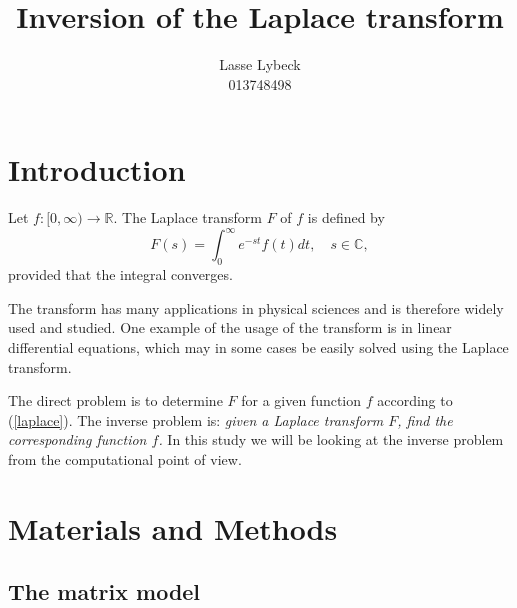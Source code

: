\documentclass[12pt,a4]{article}
\title{Inversion of the Laplace transform}
\author{Lasse Lybeck\\013748498}
\newcommand{\R}{{\mathbb R}}
\newcommand{\C}{{\mathbb C}}
\begin{document}
\maketitle

\section{Introduction}

Let $f:[0,\infty)\rightarrow \R$. The Laplace transform $F$ of $f$ is defined by
\begin{equation}\label{laplace}
 F(s) = \int_0^\infty e^{-st}f(t)dt,\quad s\in\C ,
\end{equation}
provided that the integral converges.

The transform has many applications in physical sciences and is therefore widely used and studied. One example of the usage of the transform is in linear differential equations, which may in some cases be easily solved using the Laplace transform.

The direct problem is to determine $F$ for a given function $f$ according to (\ref{laplace}). The inverse problem is: {\em given a Laplace transform $F$, find the corresponding function $f$.} In this study we will be looking at the inverse problem from the computational point of view.



\section{Materials and Methods}\label{sec:methods}

\subsection{The matrix model}
\end{document}
